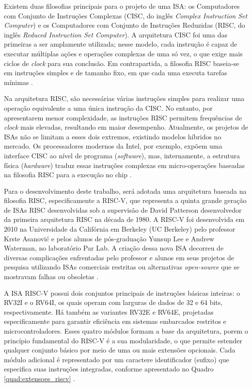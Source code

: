 Existem duas filosofias principais para o projeto de uma ISA: os Computadores com Conjunto de Instruções Complexas (CISC, do inglês \textit{Complex Instruction Set Computer}) e os Computadores com Conjunto de Instruções Reduzidas (RISC, do inglês \textit{Reduced Instruction Set Computer}). A arquitetura CISC foi uma das primeiras a ser amplamente utilizada; nesse modelo, cada instrução é capaz de executar múltiplas ações e operações complexas de uma só vez, o que exige mais ciclos de \textit{clock} para sua conclusão. Em contrapartida, a filosofia RISC baseia-se em instruções simples e de tamanho fixo, em que cada uma executa tarefas mínimas \cite{silva2024arquitetura}. 

Na arquitetura RISC, são necessárias várias instruções simples para realizar uma operação equivalente a uma única instrução da CISC. No entanto, por apresentarem menor complexidade, as instruções RISC permitem frequências de \textit{clock} mais elevadas, resultando em maior desempenho. Atualmente, os projetos de ISAs não se limitam a esses dois extremos, existindo modelos híbridos no mercado. Os processadores modernos da Intel, por exemplo, expõem uma interface CISC ao nível de programa (\textit{software}), mas, internamente, a estrutura física (\textit{hardware}) traduz essas instruções complexas em micro-operações baseadas na filosofia RISC para a execução no chip \cite{silva2024arquitetura}.

Para o desenvolvimento deste trabalho, será adotada uma arquitetura baseada na filosofia RISC, especificamente a RISC-V, que representa a quinta grande geração de ISAs RISC desenvolvidas sob a supervisão de David Patterson desenvolvedor da primeira arquitetura RISC na década de 1980. A RISC-V foi desenvolvida em 2010 na Universidade da Califórnia em Berkeley (UC Berkeley) pelo professor Krste Asanović e pelos alunos de pós-graduação Yunsup Lee e Andrew Waterman, no laboratório Par Lab. A criação dessa nova ISA decorreu de diversas complicações enfrentadas pelo professor e alunos em seus projetos de pesquisa utilizando ISAs comerciais restritas ou alternativas \textit{open-source} que se mostravam falhas ou obsoletas .


A ISA RISC-V possui dois conjuntos principais de instruções básicas inteiras: o RV32I e o RV64I, os quais operam com larguras de dados de 32 e 64 bits, respectivamente. Há também as variantes RV32E e RV64E, projetadas especificamente para garantir eficiência em sistemas embarcados restritos e microcontroladores. Esses quatro módulos formam a base da arquitetura, porem o princípio fundamental do RISC-V é a sua modularidade, o que permite estender qualquer conjunto básico por meio de uma ou mais extensões opcionais. Cada módulo adicional é representado por um caractere identificador (sufixo) que especifica suas instruções integradas, conforme apresentado no Quadro \ref{quad:extensoes_riscv} \cite{riscv_manual_2026}.



